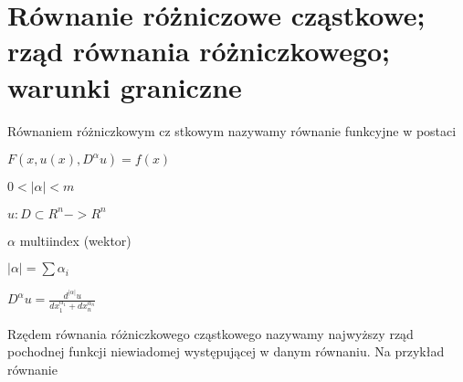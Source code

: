 \section{Równanie różniczowe cząstkowe; rząd równania różniczkowego; warunki graniczne}
Równaniem różniczkowym cz
stkowym nazywamy równanie funkcyjne w postaci

$F(x ,u(x) , D^\alpha u) = f(x)$

$0<|\alpha| < m$

$u:D \subset R^n -> R^n$

$\alpha$ multiindex (wektor)

$|\alpha| = \sum \alpha_i$

$D^\alpha u = \frac{d^{|\alpha|} u}{dx_1^{\alpha_1} + dx_n^{\alpha_n}}$


Rzędem równania różniczkowego cząstkowego nazywamy najwyższy rząd pochodnej funkcji niewiadomej występującej w danym równaniu. Na przykład równanie 